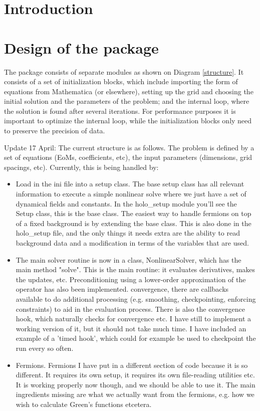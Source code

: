 \documentclass[a4paper,12pt]{article}
\begin{document}
\section{Introduction}
\section{Design of the package}
The package consists of separate modules as shown on Diagram \ref{structure}. It consists of a set of initialization blocks, which include importing the form of equations from Mathematica (or elsewhere), setting up the grid and choosing the initial solution and the parameters of the problem; and the internal loop, where the solution is found after several iterations. For performance purposes it is important to optimize the internal loop, while the initialization blocks only need to preserve the precision of data.

Update 17 April:
The current structure is as follows. The problem is defined by a set of equations (EoMs, coefficients, etc), the input parameters (dimensions, grid spacings, etc). Currently, this is being handled by:
\begin{itemize}
\item Load in the ini file into a setup class. The base setup class has all relevant information to execute a simple nonlinear solve where we just have a set of dynamical fields and constants. In the holo\_setup module you'll see
the Setup class, this is the base class. The easiest way to handle fermions on top of a fixed background is by extending the base class. This is also done in the holo\_setup file, and the only things
it needs extra are the ability to read background data and a modification in terms of the variables that are used.
\item The main solver routine is now in a class, NonlinearSolver, which has the main method "solve". This is the main routine: it evaluates derivatives, makes the
updates, etc. Preconditioning using a lower-order approximation of the operator has also been implemented. 
convergence, there are callbacks available to do additional processing (e.g. smoothing, checkpointing, enforcing constraints) to aid in the evaluation process. There is also
the convergence hook, which naturally checks for convergence etc. I have still to implement a working version of it, but it should not take much time. I have included an example of a
'timed hook', which could for example be used to checkpoint the run every so often.
\item Fermions. Fermions I have put in a different section of code because it is so different. It requires its own setup, it requires its own file-reading utilities etc. It is working properly now though, and we should be able to use it. The main ingredients missing are what we actually want from the fermions, e.g. how we wish to calculate Green's functions etcetera. 
\end{itemize}
\end{document}
